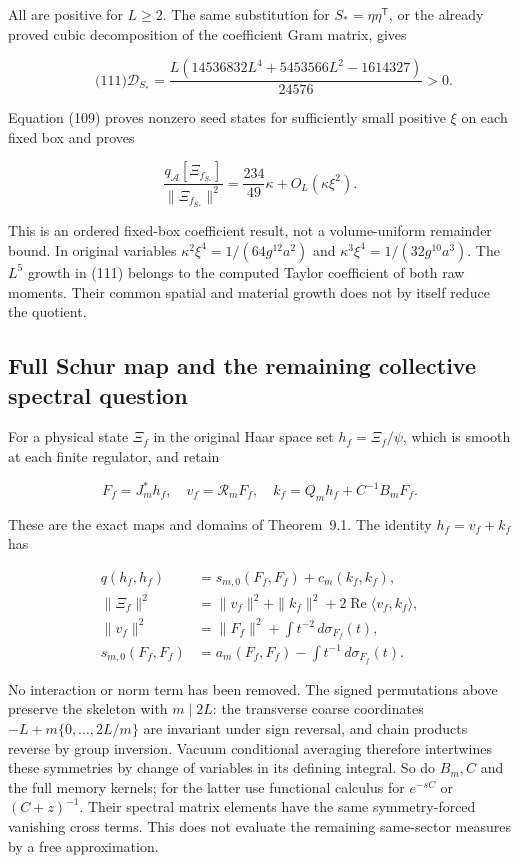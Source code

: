 All are positive for \(L\ge2\). The same substitution for
\(S_*=\eta\eta^{\mathsf T}\), or the already proved cubic decomposition
of the coefficient Gram matrix, gives

\[
\qquad\text{(111)}
 \mathcal D_{S_*}
 =\frac{L(14536832L^4+5453566L^2-1614327)}{24576}>0 .
\]

Equation (109) proves nonzero seed states for sufficiently small
positive \(\xi\) on each fixed box and proves

\[
\frac{q_{\mathcal A}[\Xi_{f_{S_*}}]}{\|\Xi_{f_{S_*}}\|^2}
       =\frac{234}{49}\kappa+O_L(\kappa\xi^2).
\]

This is an ordered fixed-box coefficient result, not a volume-uniform
remainder bound. In original variables \(\kappa^2\xi^4=1/(64g^{12}a^2)\)
and \(\kappa^3\xi^4=1/(32g^{10}a^3)\). The \(L^5\) growth in (111)
belongs to the computed Taylor coefficient of both raw moments. Their
common spatial and material growth does not by itself reduce the
quotient.

\subsection{Full Schur map and the remaining collective spectral
question}\label{fabel-tensor-transfer-md-full-schur-map-and-the-remaining-collective-spectral-question}

For a physical state \(\Xi_f\) in the original Haar space set
\(h_f=\Xi_f/\psi\), which is smooth at each finite regulator, and retain

\[
F_f=J_m^*h_f,\quad
 v_f=\mathcal R_mF_f,\quad
 k_f=Q_mh_f+C^{-1}B_mF_f.
\]

These are the exact maps and domains of Theorem~9.1. The identity
\(h_f=v_f+k_f\) has

\[
\begin{aligned}
 q(h_f,h_f)&=s_{m,0}(F_f,F_f)+c_m(k_f,k_f),\\
 \|\Xi_f\|^2&=\|v_f\|^2+\|k_f\|^2
                         +2\operatorname{Re}\langle v_f,k_f\rangle,\\
 \|v_f\|^2&=\|F_f\|^2+\int t^{-2}\,d\sigma_{F_f}(t),\\
 s_{m,0}(F_f,F_f)&=a_m(F_f,F_f)-\int t^{-1}\,d\sigma_{F_f}(t).
\end{aligned}
\]

No interaction or norm term has been removed. The signed permutations
above preserve the skeleton with \(m\mid2L\): the transverse coarse
coordinates \(-L+m\{0,\ldots,2L/m\}\) are invariant under sign reversal,
and chain products reverse by group inversion. Vacuum conditional
averaging therefore intertwines these symmetries by change of variables
in its defining integral. So do \(B_m,C\) and the full memory kernels;
for the latter use functional calculus for \(e^{-sC}\) or
\((C+z)^{-1}\). Their spectral matrix elements have the same
symmetry-forced vanishing cross terms. This does not evaluate the
remaining same-sector measures by a free approximation.

